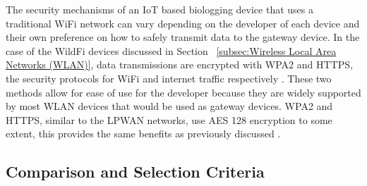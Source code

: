 \documentclass[sigplan,screen,nonacm]{acmart}
\begin{document}
The security mechanisms of an IoT based biologging device that uses a traditional WiFi network can vary 
depending on the developer of each device and their own preference on how to safely transmit data to the gateway 
device. In the case of the WildFi devices discussed in Section ~\ref{subsec:Wireless Local Area Networks (WLAN)}, data 
transmissions are encrypted with WPA2 and HTTPS, the security protocols for WiFi and internet traffic respectively 
\cite{wild2023internet}. These two methods allow for ease of 
use for the developer because they are widely supported by most WLAN devices that would be used as gateway 
devices. WPA2 and HTTPS, similar to the LPWAN networks, use AES 128 encryption to some extent, this provides the same 
benefits as previously discussed \cite{WPA2Moissinac}. 

\subsection{Comparison and Selection Criteria}
\label{subsec:Protocol Comparison and Selection Criteria}
\end{document}
